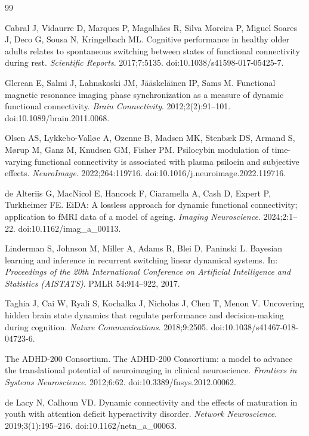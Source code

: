 \documentclass[11pt]{ctexart}
\theoremstyle{definition}
\begin{document}
\begin{thebibliography}{99}

Cabral J, Vidaurre D, Marques P, Magalh\~aes R, Silva Moreira P, Miguel Soares J, Deco G,
Sousa N, Kringelbach ML.
Cognitive performance in healthy older adults relates to spontaneous switching between
states of functional connectivity during rest.
\textit{Scientific Reports}. 2017;7:5135. doi:10.1038/s41598-017-05425-7.

Glerean E, Salmi J, Lahnakoski JM, J\"a\"askel\"ainen IP, Sams M.
Functional magnetic resonance imaging phase synchronization as a measure of dynamic
functional connectivity.
\textit{Brain Connectivity}. 2012;2(2):91--101. doi:10.1089/brain.2011.0068.

Olsen AS, Lykkebo-Vall\o e A, Ozenne B, Madsen MK, Stenb\ae k DS, Armand S, M\o rup M, Ganz
M, Knudsen GM, Fisher PM.
Psilocybin modulation of time-varying functional connectivity is associated with plasma
psilocin and subjective effects.
\textit{NeuroImage}. 2022;264:119716. doi:10.1016/j.neuroimage.2022.119716.

de Alteriis G, MacNicol E, Hancock F, Ciaramella A, Cash D, Expert P, Turkheimer FE.
EiDA: A lossless approach for dynamic functional connectivity; application to fMRI data of
a model of ageing.
\textit{Imaging Neuroscience}. 2024;2:1--22. doi:10.1162/imag\_a\_00113.

Linderman S, Johnson M, Miller A, Adams R, Blei D, Paninski L.
Bayesian learning and inference in recurrent switching linear dynamical systems.
In: \textit{Proceedings of the 20th International Conference on Artificial Intelligence and
Statistics (AISTATS)}. PMLR 54:914--922, 2017.

Taghia J, Cai W, Ryali S, Kochalka J, Nicholas J, Chen T, Menon V.
Uncovering hidden brain state dynamics that regulate performance and decision-making during
cognition.
\textit{Nature Communications}. 2018;9:2505. doi:10.1038/s41467-018-04723-6.

The ADHD-200 Consortium.
The ADHD-200 Consortium: a model to advance the translational potential of neuroimaging in
clinical neuroscience.
\textit{Frontiers in Systems Neuroscience}. 2012;6:62. doi:10.3389/fnsys.2012.00062.

de Lacy N, Calhoun VD.
Dynamic connectivity and the effects of maturation in youth with attention deficit
hyperactivity disorder.
\textit{Network Neuroscience}. 2019;3(1):195--216. doi:10.1162/netn\_a\_00063.


\end{thebibliography}
\end{document}
